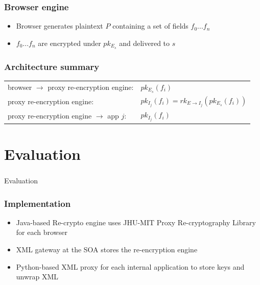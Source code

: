 \documentclass{beamer}
\begin{document}
\begin{frame}
\frametitle{Browser engine}
\begin{itemize}
\item \alert{Browser} generates plaintext $P$ containing a set of fields
$f_0...f_n$
\item $f_0...f_n$ are encrypted under $pk_{E_s}$ and delivered to $s$
\end{itemize}
\end{frame}


\begin{frame}
\frametitle{Architecture summary}
\begin{tabular}{ll}
browser $\to$ proxy re-encryption engine: & $pk_{E_s}(f_i)$ \\
proxy re-encryption engine: & $pk_{I_j}(f_i) = rk_{E \to I_j}(pk_{E_s}(f_i))$ \\
proxy re-encryption engine $\to$ app $j$: & $pk_{I_j}(f_i)$ \\
\end{tabular}
\end{frame}

\section{Evaluation}
\begin{frame}
\frametitle{}
\begin{center}
Evaluation
\end{center}
\end{frame}

\begin{frame}
\frametitle{Implementation}
\begin{itemize}
\item Java-based Re-crypto engine uses JHU-MIT Proxy Re-cryptography Library
for each browser 
\item XML gateway at the SOA stores the re-encryption engine 
\item Python-based XML proxy for each internal application to store keys and
unwrap XML
\end{itemize}
\end{frame}
\end{document}

